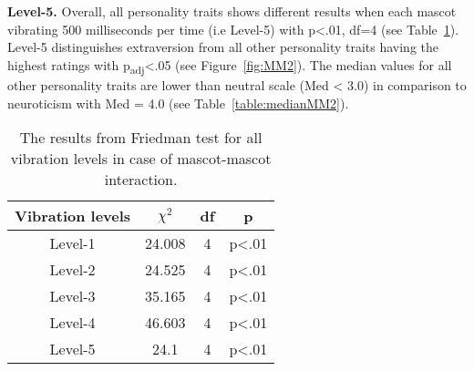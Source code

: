 \par\textbf{Level-5.}
Overall, all personality traits shows different results when each mascot vibrating 500 milliseconds
per time (i.e Level-5) with p<.01, df=4 (see Table~\ref{table:friedmanMM2}).
Level-5 distinguishes extraversion from all other personality traits having the
highest ratings with p\textsubscript{adj}<.05 (see Figure~\ref{fig:MM2}).
The median values for all other personality traits are lower than neutral scale (Med < 3.0)
in comparison to neuroticism with Med = 4.0 (see Table~\ref{table:medianMM2}).

\begin{table}[H]
    \renewcommand{\arraystretch}{1}
    \begin{center}
        \begin{tabular}{|c|c|c|c|}
            \hline
            \textbf{Vibration levels} & \textbf{$\chi^2$} & \textbf{df} & \textbf{p} \\
            \hline
            Level-1 &24.008 &4 &p<.01 \\
            \hline
            Level-2 &24.525 &4 &p<.01 \\
            \hline
            Level-3 &35.165 &4 &p<.01 \\
            \hline
            Level-4 &46.603 &4 &p<.01 \\
            \hline
            Level-5 &24.1 &4 &p<.01 \\
            \hline
        \end{tabular}
        \caption{The results from Friedman test for all vibration levels in case of mascot-mascot interaction.}
        \label{table:friedmanMM2}
    \end{center}
\end{table}

